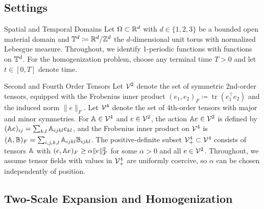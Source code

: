 \documentclass[3p, 12pt, preprint]{elsarticle}
\begin{document}
\subsection{Settings}\label{subsec:formal_homogenization_settings}

\begin{namedparagraph}{Spatial and Temporal Domains}
Let $\Omega\subset\mathbb{R}^{d}$ with $d\in\{1,2,3\}$ be a bounded open material domain and $\mathbb{T}^d\coloneqq\mathbb{R}^{d}/\mathbb{Z}^d$ the $d$-dimensional unit torus with normalized Lebesgue measure. Throughout, we identify 1-periodic functions with functions on $\mathbb{T}^d$. For the homogenization problem, choose any terminal time $T>0$ and let $t\in[0,T]$ denote time.
\end{namedparagraph}

\begin{namedparagraph}{Second and Fourth Order Tensors}
Let ${\mathcal{V}}^2$ denote the set of symmetric 2nd-order tensors, equipped with the Frobenius inner product $(e_1, e_2)_F\coloneqq{\operatorname{tr}}(e_1^{\top}e_2)$ and the induced norm $\|e\|_{F}$. Let ${\mathcal{V}}^4$ denote the set of 4th-order tensors with major and minor symmetries. For $\mathbb{A} \in {\mathcal{V}}^4$ and $e \in {\mathcal{V}}^2$, the action $\mathbb{A} e \in {\mathcal{V}}^2$ is defined by $(\mathbb{A} e)_{ij} = \sum_{k,l} \mathbb{A}_{ijkl} e_{kl}$, and the Frobenius inner product on ${\mathcal{V}}^4$ is $(\mathbb{A},\mathbb{B})_F = \sum_{i,j,k,l} \mathbb{A}_{ijkl}\mathbb{B}_{ijkl}$. The positive-definite subset ${\mathcal{V}}^4_{+}\subset{\mathcal{V}}^4$ consists of tensors $\mathbb{A}$ with $(e,\mathbb{A} e)_F\geq \alpha \|e\|_{F}^2$ for some $\alpha>0$ and all $e\in{\mathcal{V}}^2$. Throughout, we assume tensor fields with values in ${\mathcal{V}}^4_{+}$ are uniformly coercive, so $\alpha$ can be chosen independently of position.
\end{namedparagraph}

\subsection{Two-Scale Expansion and Homogenization}\label{subsec:two_scale_expansion_homogenization}
\end{document}
